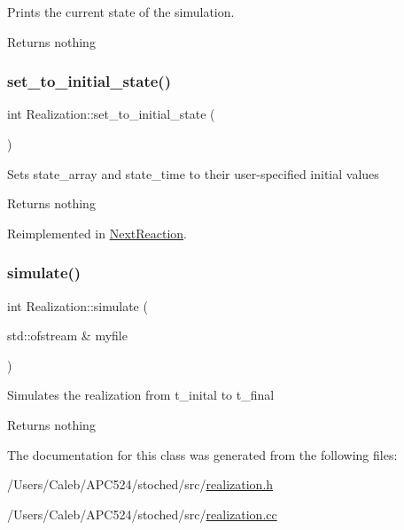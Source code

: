 Prints the current state of the simulation. 

\begin{DoxyReturn}{Returns}
nothing 
\end{DoxyReturn}
\mbox{\label{class_realization_a391a89af7574a9053f53f8a299c2cc70}} 
\subsubsection{\texorpdfstring{set\+\_\+to\+\_\+initial\+\_\+state()}{set\_to\_initial\_state()}}
{\footnotesize\ttfamily int Realization\+::set\+\_\+to\+\_\+initial\+\_\+state (\begin{DoxyParamCaption}{ }\end{DoxyParamCaption})\hspace{0.3cm}{\ttfamily [virtual]}}

Sets state\+\_\+array and state\+\_\+time to their user-\/specified initial values

\begin{DoxyReturn}{Returns}
nothing 
\end{DoxyReturn}


Reimplemented in \hyperlink{class_next_reaction_a0cc63c4ec9fe3f338472fff302f6d746}{Next\+Reaction}.

\mbox{\label{class_realization_a4e21bc7355e33c17d1401736b3c62413}} 
\subsubsection{\texorpdfstring{simulate()}{simulate()}}
{\footnotesize\ttfamily int Realization\+::simulate (\begin{DoxyParamCaption}\item[{std\+::ofstream \&}]{myfile }\end{DoxyParamCaption})}

Simulates the realization from t\+\_\+inital to t\+\_\+final

\begin{DoxyReturn}{Returns}
nothing 
\end{DoxyReturn}


The documentation for this class was generated from the following files\+:\begin{DoxyCompactItemize}
\item 
/\+Users/\+Caleb/\+A\+P\+C524/stoched/src/\hyperlink{realization_8h}{realization.\+h}\item 
/\+Users/\+Caleb/\+A\+P\+C524/stoched/src/\hyperlink{realization_8cc}{realization.\+cc}\end{DoxyCompactItemize}
